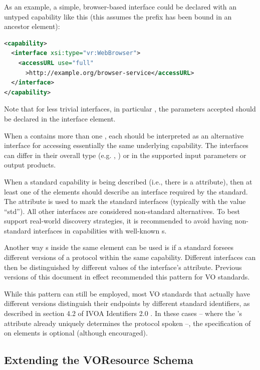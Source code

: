\documentclass[11pt,a4paper]{ivoa}
\begin{document}
As an example, a simple, browser-based interface could be declared with
an untyped capability like this (this assumes the  prefix has
been bound in an ancestor element):
\begin{lstlisting}[language=XML]
<capability>
  <interface xsi:type="vr:WebBrowser">
    <accessURL use="full"
      >http://example.org/browser-service</accessURL>
  </interface>
</capability>
\end{lstlisting}
Note that for less trivial interfaces, in particular
, the parameters accepted should be declared in the
interface element.

When a  contains more than one
, each  should be
interpreted as an alternative interface for accessing essentially the
same underlying capability.  The interfaces can differ in their
overall type (e.g. ,
) or in the supported input parameters or
output products.


When a standard capability is being described (i.e., there is a
 attribute), then at least one of the
 elements should describe an interface required
by the standard.  The  attribute is used to mark the
standard interfaces (typically with the value ``std'').
All other interfaces are considered non-standard
alternatives.  To best support real-world discovery strategies, it is
recommended to avoid having non-standard interfaces in capabilities
with well-known s.

Another way s inside the same
 element can be used is if a standard forsees
different versions of a protocol within the same capability.  Different
interfaces can then be distinguished by different values of the
interface's  attribute.  Previous versions of this
document in effect recommended this pattern for VO standards.

While this pattern can still be employed, most VO standards that
actually have different versions distinguish their endpoints by
different standard identifiers, as described in section 4.2 of IVOA
Identifiers 2.0 \citep{2016ivoa.spec.0523D}.  In these cases -- where the
's  attribute already uniquely
determines the protocol spoken --, the specification of 
on  elements is optional (although encouraged).

\subsection{Extending the VOResource Schema}
\end{document}
